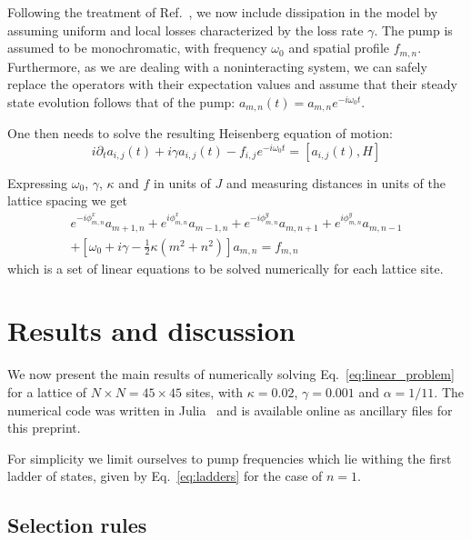 \documentclass[twocolumn, 10pt, aps, superscriptaddress, floatfix, showpacs, pra, citeautoscript]{revtex4-1}
\begin{document}
Following the treatment of Ref.~, we now
include dissipation in the model by assuming uniform and local losses
characterized by the loss rate $\gamma$. The pump is assumed to be
monochromatic, with frequency $\omega_0$ and spatial profile
$f_{m,n}$.  Furthermore, as we are dealing with a noninteracting
system, we can safely replace the operators with their expectation
values and assume that their steady state evolution follows that of
the pump: $a_{m,n}(t) = a_{m,n} e^{-i \omega_0 t}$.

One then needs to solve the resulting Heisenberg equation of motion:
%
\begin{equation}
i\partial_{t}a_{i,j}(t)+i\gamma
a_{i,j}(t)-f_{i,j}e^{-i\omega_{0}t}=\left[a_{i,j}(t),H\right]
\end{equation}

Expressing $\omega_{0}$, $\gamma$, $\kappa$ and $f$ in units of $J$
and measuring distances in units of the lattice spacing we get
%
\begin{multline}\label{eq:linear_problem}
e^{-i\phi_{m,n}^x}a_{m+1,n}+e^{i\phi_{m,n}^x}a_{m-1,n}+e^{-i\phi_{m,n}^y}a_{m,n+1}+e^{i\phi_{m,n}^y}a_{m,n-1}\\
+\left[\omega_{0}+i\gamma-\frac{1}{2}\kappa
(m^{2}+n^{2})\right]a_{m,n}=f_{m,n}
\end{multline}
which is a set of linear equations to be solved numerically for each
lattice site.


\section{Results and discussion}
\label{sec:results}

We now present the main results of numerically solving
Eq.~\eqref{eq:linear_problem} for a lattice of
$N \times N = 45 \times 45$ sites, with $\kappa = 0.02$,
$\gamma = 0.001$ and $\alpha = 1/11$.  The numerical code was written
in Julia~\cite{bezanson2014julia} and is available online as ancillary
files for this preprint.

For simplicity we limit ourselves to pump frequencies which lie
withing the first ladder of states, given by Eq.~\eqref{eq:ladders}
for the case of $n = 1$.


\subsection{Selection rules}
\label{sec:selection}
\end{document}
